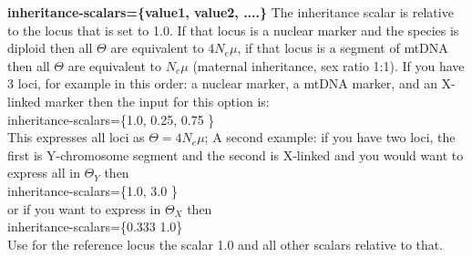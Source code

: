 \begin{description}
%
%
%

\item \textbf{ inheritance-scalars=\{value1, value2, ....\}} 
The inheritance scalar is relative to the locus that is set to 1.0. If that locus is a nuclear marker and the species is diploid then all $\Theta$ are equivalent to $4N_e\mu$, if that locus is a segment of mtDNA then all $\Theta$ are equivalent to $N_e\mu$ (maternal inheritance, sex ratio 1:1). If you have 3 loci, for example in this order: a nuclear marker, a mtDNA marker, and an X-linked marker then the input for this option is:\\
inheritance-scalars=\{1.0, 0.25, 0.75 \}\\
This expresses all loci as $\Theta=4N_e\mu$; A second example: if you have two loci, the first is Y-chromosome segment and the second is X-linked and you would want to express all in $\Theta_Y$ then \\
inheritance-scalars=\{1.0, 3.0 \}\\
or if you want to express in $\Theta_X$ then\\
inheritance-scalars=\{0.333 1.0\}\\
Use for the reference locus the scalar 1.0 and all other scalars relative to that.


\end{description}

